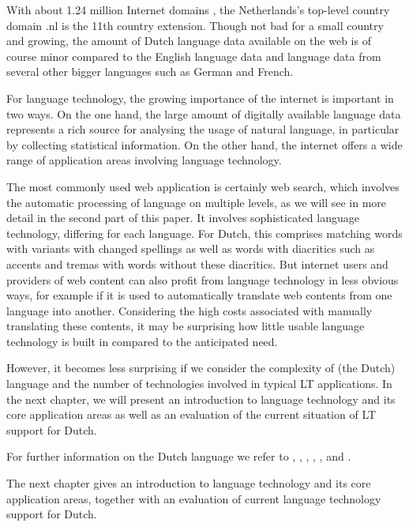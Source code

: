 \documentclass[]{../../metanetpaper}
\begin{document}
\begin{multicols}{2}

    With about 1.24 million Internet domains \cite{Webstats}, the Netherlands's top-level country domain .nl is the 11th country extension. Though not bad for a small country and growing, the amount of Dutch language data available on the web is of course minor compared to the English language data and language data from several other bigger languages such as German and French.

    For language technology, the growing importance of the internet is important in two ways. On the one hand, the large amount of digitally available language data represents a rich source for analysing the usage of natural language, in particular by collecting statistical information. On the other hand, the internet offers a wide range of application areas involving language technology.


    The most commonly used web application is certainly web search, which involves the automatic processing of language on multiple levels, as we will see in more detail in the second part of this paper. It involves sophisticated language technology, differing for each language. For Dutch, this comprises matching words with variants with changed spellings as well as words with diacritics such as accents and tremas with words without these diacritics. But internet users and providers of web content can also profit from language technology in less obvious ways, for example if it is used to automatically translate web contents from one language into another. Considering the high costs associated with manually translating these contents, it may be surprising how little usable language technology is built in compared to the anticipated need.

    However, it becomes less surprising if we consider the complexity of (the Dutch) language and the number of technologies involved in typical LT applications. In the next chapter, we will present an introduction to language technology and its core application areas as well as an evaluation of the current situation of LT support for Dutch.

    For further information on the Dutch language we refer to \cite{e-ans}, \cite{TUFenW}, \cite{NedWiki:Fries}, \cite{NedWiki:Nederlands}, \cite{NedWiki:Nedersaksisch},  \cite{Ethn-Dutch} and \cite{Ethn-LN}.

The next chapter gives an introduction to language technology and its core application areas, together with an evaluation of current language technology support for Dutch.
\end{multicols}
\end{document}
